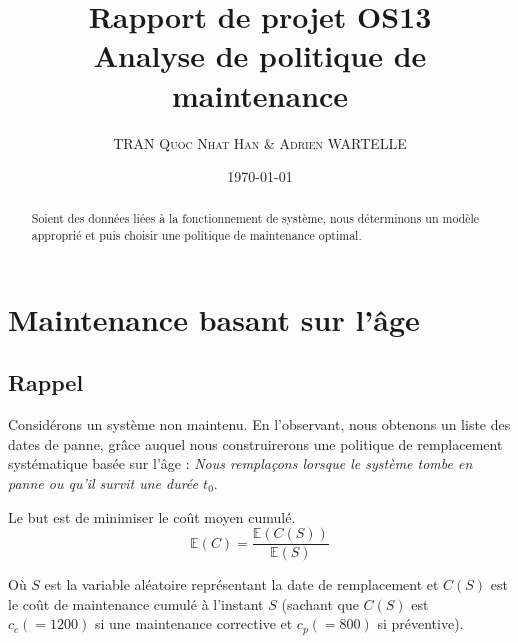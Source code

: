 \documentclass[10pt,a4paper]{article}
\author{\textsc{TRAN Quoc Nhat Han} \& \textsc{Adrien WARTELLE}}
\title{Rapport de projet OS13\\Analyse de politique de maintenance}
\date{\today}
\begin{document}
\maketitle
\renewcommand{\contentsname}{Sommaire}
\tableofcontents
\begin{abstract}
Soient des données liées à la fonctionnement de système, nous déterminons un modèle approprié et puis choisir une politique de maintenance optimal.
\end{abstract}
\section{Maintenance basant sur l'âge}
\subsection{Rappel}
Considérons un système non maintenu. En l'observant, nous obtenons un liste des dates de panne, grâce auquel nous construirerons une politique de remplacement systématique basée sur l'âge : \emph{Nous remplaçons lorsque le système tombe en panne ou qu'il survit une durée $t_0$}.

Le but est de minimiser le coût moyen cumulé.
\begin{equation}
    \label{coutmoyduree}
    \mathbb{E}(C) = \frac{\mathbb{E}(C(S))}{\mathbb{E}(S)}
\end{equation}

Où $S$ est la variable aléatoire représentant la date de remplacement et $C(S)$ est le coût de maintenance cumulé à l'instant $S$ (sachant que $C(S)$ est $c_c (=1200)$ si une maintenance corrective et $c_p(=800)$ si préventive).
\end{document}
